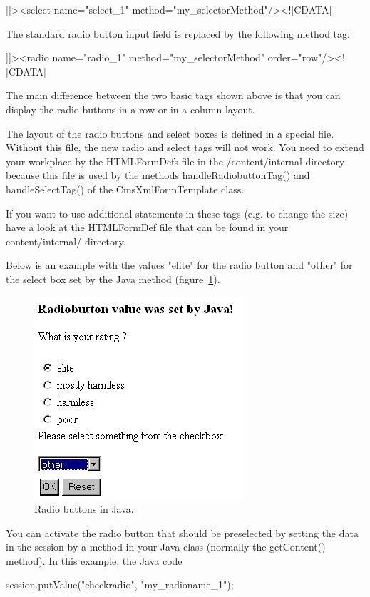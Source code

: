 {\code ]]><select name="select\_1" method="my\_selectorMethod"/><![CDATA[}

The standard radio button input field is replaced by the following
method tag:

{\code ]]><radio name="radio\_1" method="my\_selectorMethod" order="row"/><![CDATA[}

The main difference between the two basic tags shown above is that you
can display the radio buttons in a row or in a column layout.

The layout of the radio buttons and select boxes is defined in a special
file. Without this file, the new radio and select tags will not work.
You need to extend your workplace by the HTMLFormDefs file in the
/content/internal directory because this file is used by the methods
{\tag handleRadiobuttonTag()} and {\tag handleSelectTag()} of the {\class CmsXmlFormTemplate}
class.

If you want to use additional statements in these tags (e.g. to change
the size) have a look at the HTMLFormDef file that can be found in your
{\dir content/internal/} directory.

Below is an example with the values "elite" for the radio button and
"other" for the select box set by the Java method (figure~\ref{RadioButtons}).

\begin{figure}
\begin{center}
\includegraphics[clip,width=0.4\linewidth]{pics/modules/47}
\end{center}
\caption[Radio buttons in Java]{Radio buttons in Java.}
\label{RadioButtons}
\end{figure}

You can activate the radio button that should be preselected by setting
the data  in the session by a method in your Java class (normally the
{\meth getContent()} method). In this example, the Java code 

\begin{java}
{\code session.putValue("checkradio", "my\_radioname\_1")};
\end{java}

